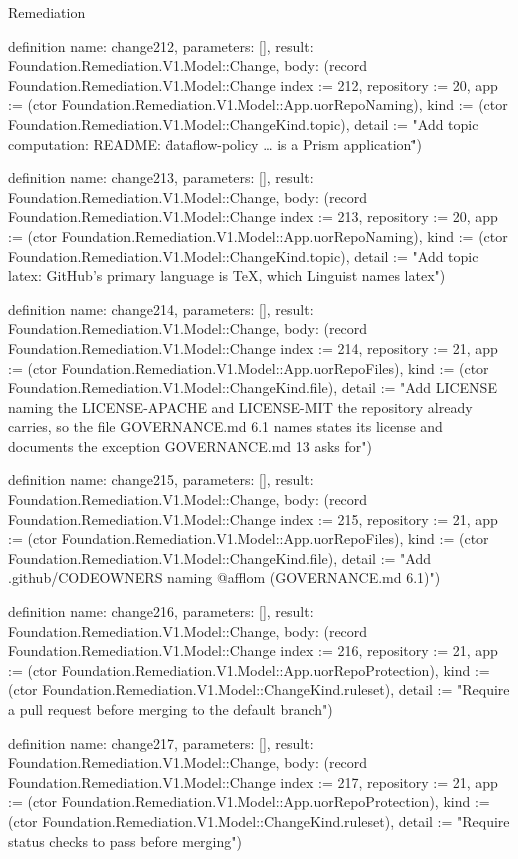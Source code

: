 \begin{lexlean}{Remediation}
\begin{semanticmodule}
definition{
  name: change212,
  parameters: [],
  result: Foundation.Remediation.V1.Model::Change,
  body: (record Foundation.Remediation.V1.Model::Change {index := 212, repository := 20, app := (ctor Foundation.Remediation.V1.Model::App.uorRepoNaming), kind := (ctor Foundation.Remediation.V1.Model::ChangeKind.topic), detail := "Add topic computation: README: \"dataflow-policy … is a Prism application\""})
}

definition{
  name: change213,
  parameters: [],
  result: Foundation.Remediation.V1.Model::Change,
  body: (record Foundation.Remediation.V1.Model::Change {index := 213, repository := 20, app := (ctor Foundation.Remediation.V1.Model::App.uorRepoNaming), kind := (ctor Foundation.Remediation.V1.Model::ChangeKind.topic), detail := "Add topic latex: GitHub's primary language is TeX, which Linguist names latex"})
}

definition{
  name: change214,
  parameters: [],
  result: Foundation.Remediation.V1.Model::Change,
  body: (record Foundation.Remediation.V1.Model::Change {index := 214, repository := 21, app := (ctor Foundation.Remediation.V1.Model::App.uorRepoFiles), kind := (ctor Foundation.Remediation.V1.Model::ChangeKind.file), detail := "Add LICENSE naming the LICENSE-APACHE and LICENSE-MIT the repository already carries, so the file GOVERNANCE.md 6.1 names states its license and documents the exception GOVERNANCE.md 13 asks for"})
}

definition{
  name: change215,
  parameters: [],
  result: Foundation.Remediation.V1.Model::Change,
  body: (record Foundation.Remediation.V1.Model::Change {index := 215, repository := 21, app := (ctor Foundation.Remediation.V1.Model::App.uorRepoFiles), kind := (ctor Foundation.Remediation.V1.Model::ChangeKind.file), detail := "Add .github/CODEOWNERS naming @afflom (GOVERNANCE.md 6.1)"})
}

definition{
  name: change216,
  parameters: [],
  result: Foundation.Remediation.V1.Model::Change,
  body: (record Foundation.Remediation.V1.Model::Change {index := 216, repository := 21, app := (ctor Foundation.Remediation.V1.Model::App.uorRepoProtection), kind := (ctor Foundation.Remediation.V1.Model::ChangeKind.ruleset), detail := "Require a pull request before merging to the default branch"})
}

definition{
  name: change217,
  parameters: [],
  result: Foundation.Remediation.V1.Model::Change,
  body: (record Foundation.Remediation.V1.Model::Change {index := 217, repository := 21, app := (ctor Foundation.Remediation.V1.Model::App.uorRepoProtection), kind := (ctor Foundation.Remediation.V1.Model::ChangeKind.ruleset), detail := "Require status checks to pass before merging"})
}


\end{semanticmodule}
\end{lexlean}
